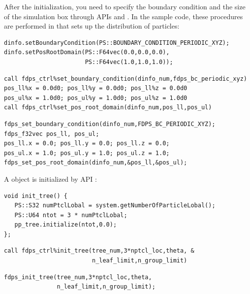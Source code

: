 \begin{description}[leftmargin=*,font=\normalfont\slshape]
After the initialization, you need to specify the boundary condition and the size of the simulation box through APIs  and . In the sample code, these procedures are performed in \procedure {} that sets up the distribution of particles:
\ifCpp
\begin{lstlisting}
dinfo.setBoundaryCondition(PS::BOUNDARY_CONDITION_PERIODIC_XYZ);
dinfo.setPosRootDomain(PS::F64vec(0.0,0.0,0.0),
                       PS::F64vec(1.0,1.0,1.0));
\end{lstlisting}
\endifCpp
\ifFtn
\begin{lstlisting}
call fdps_ctrl%set_boundary_condition(dinfo_num,fdps_bc_periodic_xyz)
pos_ll%x = 0.0d0; pos_ll%y = 0.0d0; pos_ll%z = 0.0d0
pos_ul%x = 1.0d0; pos_ul%y = 1.0d0; pos_ul%z = 1.0d0
call fdps_ctrl%set_pos_root_domain(dinfo_num,pos_ll,pos_ul)
\end{lstlisting}
\endifFtn
\ifC
\begin{lstlisting}
fdps_set_boundary_condition(dinfo_num,FDPS_BC_PERIODIC_XYZ);
fdps_f32vec pos_ll, pos_ul;
pos_ll.x = 0.0; pos_ll.y = 0.0; pos_ll.z = 0.0;
pos_ul.x = 1.0; pos_ul.y = 1.0; pos_ul.z = 1.0;
fdps_set_pos_root_domain(dinfo_num,&pos_ll,&pos_ul);
\end{lstlisting}
\endifC


\item[(iii) Initialization of a \describeForEach{\textsf{TreeForForceLong}}{\textsf{Tree}}{\textsf{Tree}} object]
A  object is initialized by API :
\ifCpp
\begin{lstlisting}[caption=Initialization of a \textsf{TreeForForceLong} object]
void init_tree() {
   PS::S32 numPtclLobal = system.getNumberOfParticleLobal();
   PS::U64 ntot = 3 * numPtclLobal;
   pp_tree.initialize(ntot,0.0);
}; 
\end{lstlisting}
\endifCpp
\ifFtn
\begin{lstlisting}[caption=Initialization of a \textsf{Tree} object]
call fdps_ctrl%init_tree(tree_num,3*nptcl_loc,theta, &
                         n_leaf_limit,n_group_limit)
\end{lstlisting}
\endifFtn
\ifC
\begin{lstlisting}[caption=Initialization of a \textsf{Tree} object]
fdps_init_tree(tree_num,3*nptcl_loc,theta,
               n_leaf_limit,n_group_limit);
\end{lstlisting}
\endifC


\end{description}
